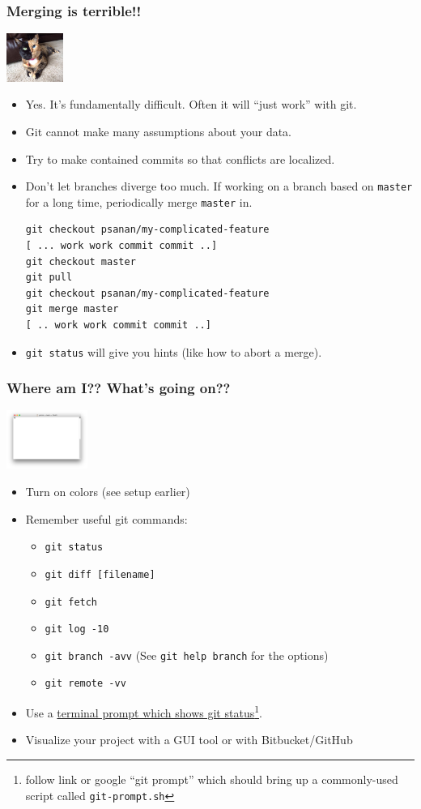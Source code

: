 \documentclass{beamer}
\begin{document}
\begin{frame}[fragile]
\frametitle{Merging is terrible!!}
\includegraphics[width=70px]{chimera.jpg}
\begin{itemize}
\item Yes. It's fundamentally difficult. Often it will ``just work'' with git.
\item Git cannot make many assumptions about your data.
\item Try to make contained commits so that conflicts are localized.
\item Don't let branches diverge too much. If working on a branch based on \texttt{master} for a long time, periodically merge \texttt{master} in.
\begin{lstlisting}
git checkout psanan/my-complicated-feature
[ ... work work commit commit ..]
git checkout master
git pull
git checkout psanan/my-complicated-feature
git merge master
[ .. work work commit commit ..]
\end{lstlisting}
\item \lstinline{git status} will give you hints (like how to abort a merge).
\end{itemize}
\end{frame}

\begin{frame}[fragile]
\frametitle{Where am I?? What's going on??}
\includegraphics[width=100px]{term}
\begin{itemize}
\item Turn on colors (see setup earlier)
\item 
Remember useful git commands:
\begin{itemize}
\item \lstinline{git status}
\item \lstinline{git diff [filename]}
\item \lstinline{git fetch}
\item \lstinline{git log -10}
\item \lstinline{git branch -avv} (See \lstinline{git help branch} for the options)
\item \lstinline{git remote -vv}
\end{itemize}
\item Use a \href{https://raw.githubusercontent.com/git/git/master/contrib/completion/git-prompt.sh}{terminal prompt which shows git status}\footnote{follow link or google ``git prompt'' which should bring up a commonly-used script called \texttt{git-prompt.sh}}.
\item Visualize your project with a GUI tool or with Bitbucket/GitHub
\end{itemize}
\end{frame}
\end{document}
